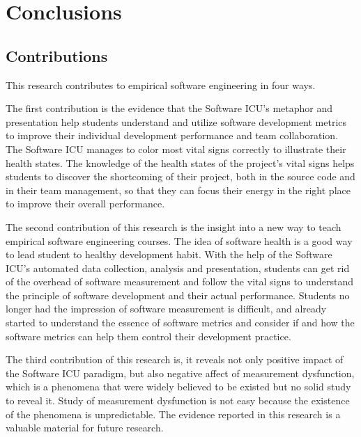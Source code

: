 \chapter{Conclusions}

\section{Contributions}
This research contributes to empirical software engineering in four ways.

The first contribution is the evidence that the Software ICU's metaphor and presentation help students understand and utilize software development metrics to improve their individual development performance and team collaboration. The Software ICU manages to color most vital signs correctly to illustrate their health states. The knowledge of the health states of the project's vital signs helps students to discover the shortcoming of their project, both in the source code and in their team management, so that they can focus their energy in the right place to improve their overall performance. 

The second contribution of this research is the insight into a new way to teach empirical software engineering courses. The idea of software health is a good way to lead student to healthy development habit. With the help of the Software ICU's automated data collection, analysis and presentation, students can get rid of the overhead of software measurement and follow the vital signs to understand the principle of software development and their actual performance. Students no longer had the impression of software measurement is difficult, and already started to understand the essence of software metrics and consider if and how the software metrics can help them control their development practice.

The third contribution of this research is, it reveals not only positive impact of the Software ICU paradigm, but also negative affect of measurement dysfunction, which is a phenomena that were widely believed to be existed but no solid study to reveal it. Study of measurement dysfunction is not easy because the existence of the phenomena is unpredictable. The evidence reported in this research is a valuable material for future research.

